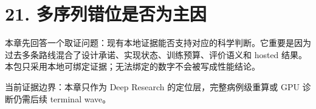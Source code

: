 \section{21. 多序列错位是否为主因}

本章先回答一个取证问题：现有本地证据能否支持对应的科学判断。它重要是因为过去多条路线混合了设计承诺、实现状态、训练预算、评价语义和 hosted 结果。本包只采用本地可绑定证据；无法绑定的数字不会被写成性能结论。



当前证据边界：本章只作为 Deep Research 的定位层，完整病例级重算或 GPU 诊断仍需后续 terminal wave。



\clearpage